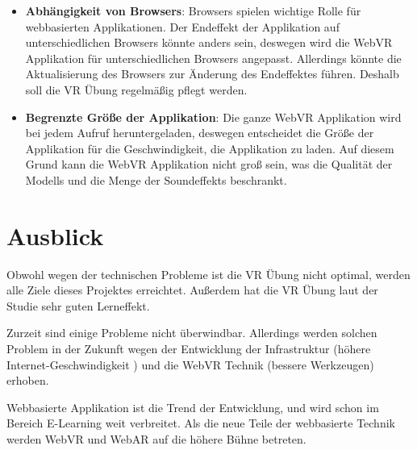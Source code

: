 \begin{itemize}
    \item \textbf{Abhängigkeit von Browsers}: Browsers spielen wichtige Rolle für webbasierten Applikationen. Der Endeffekt der Applikation auf unterschiedlichen Browsers könnte anders sein, deswegen wird die WebVR Applikation für unterschiedlichen Browsers angepasst. Allerdings könnte die Aktualisierung des Browsers zur Änderung des Endeffektes führen. Deshalb soll die VR Übung regelmäßig pflegt werden.
    
    \item \textbf{Begrenzte Größe der Applikation}: Die ganze WebVR Applikation wird bei jedem Aufruf heruntergeladen, deswegen entscheidet die Größe der Applikation für die Geschwindigkeit, die Applikation zu laden. Auf diesem Grund kann die WebVR Applikation nicht groß sein, was die Qualität der Modells und die Menge der Soundeffekts beschrankt.
\end{itemize}

\section{Ausblick}

Obwohl wegen der technischen Probleme ist die VR Übung nicht optimal, werden alle Ziele dieses Projektes erreichtet. Außerdem hat die VR Übung laut der Studie sehr guten Lerneffekt.

Zurzeit sind einige Probleme nicht überwindbar. Allerdings werden solchen Problem in der Zukunft wegen der Entwicklung der Infrastruktur (höhere Internet-Geschwindigkeit ) und die WebVR Technik (bessere Werkzeugen) erhoben.

Webbasierte Applikation ist die Trend der Entwicklung, und wird schon im Bereich E-Learning weit verbreitet. Als die neue Teile der webbasierte Technik werden WebVR und WebAR auf die höhere Bühne betreten.
